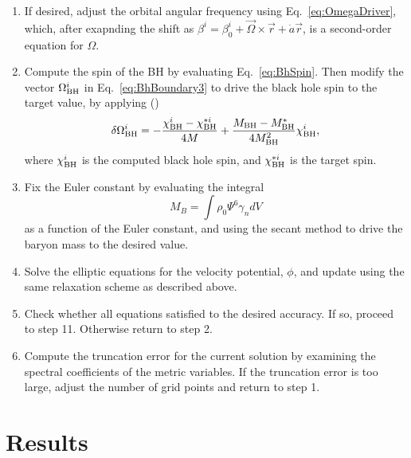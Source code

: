 \begin{enumerate}
\item If desired, adjust the orbital angular frequency using
  Eq.~\ref{eq:OmegaDriver}, which, after exapnding the shift as 
$\beta^i=\beta^i_0 +
\vec{\Omega}\times\vec{r} + \dot{a}\vec{r}$, is a second-order
equation for $\Omega$.
\item Compute the spin of the BH by evaluating Eq.~\ref{eq:BhSpin}. Then
  modify the vector $\Omega^i_{\rm BH}$ in Eq.~\ref{eq:BhBoundary3} to drive
  the black hole spin to the target value,  by applying (\cite{Buchman:2012dw})
\begin{equation}
\delta \Omega_{\rm BH}^i = -\frac{\chi^i_{\rm BH}-\chi_{\rm
    BH}^{*i}}{4M}+\frac{M_{\rm BH}-M_{\rm BH}^{*}}{4M_{\rm
    BH}^2}\chi_{\rm BH}^i,
\end{equation}
where $\chi^i_{\rm BH}$ is the computed black hole spin, and $\chi_{\rm
    BH}^{*i}$ is the target spin.
\item Fix the Euler constant by evaluating the integral
\begin{equation}
M_{B}=\int \rho_0\Psi^6\gamma_ndV
\end{equation}
as a function of the Euler
constant, and using the secant method to drive the baryon mass to the
desired value.

\item Solve the elliptic equations for the velocity potential, $\phi$,
  and update using the same relaxation scheme as described above.

\item Check whether all equations satisfied to the desired
  accuracy. If so, proceed to step 11. Otherwise return to step 2.

\item Compute the truncation error for the current solution by
  examining the spectral coefficients of the metric variables. If the
  truncation error is too large, adjust the number of grid points and
  return to step 1.

\end{enumerate}

\section{Results}
\label{sec:Results}

